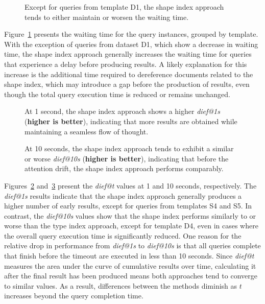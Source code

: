 \begin{figure}
    \centering
    
    \caption{Except for queries from template D1, the shape index approach tends to either maintain or worsen the waiting time.}
    \label{fig:waiting_time}
\end{figure}

Figure~\ref{fig:waiting_time} presents the waiting time for the query instances, grouped by template. 
With the exception of queries from dataset D1, which show a decrease in waiting time, the shape index approach generally increases the waiting time for queries that experience a delay before producing results. 
A likely explanation for this increase is the additional time required to dereference documents related to the shape index, which may introduce a gap before the production of results, even though the total query execution time is reduced or remains unchanged.


\begin{figure}
    \centering
    
    \caption{At 1 second, the shape index approach shows a higher \textit{dief@1s} (\textbf{higher is better}), indicating that more results are obtained while maintaining a seamless flow of thought.}
    \label{fig:dief_1}
\end{figure}

\begin{figure}
    \centering
    
    \caption{At 10 seconds, the shape index approach tends to exhibit a similar or worse \textit{dief@10s} (\textbf{higher is better}), indicating that before the attention drift, the shape index approach performs comparably.}
    \label{fig:dief_10}
\end{figure}

Figures~\ref{fig:dief_1} and~\ref{fig:dief_10} present the \textit{dief@t} values at 1 and 10 seconds, respectively.
The \textit{dief@1s} results indicate that the shape index approach generally produces a higher number of early results, except for queries from templates S4 and S5.
In contrast, the \textit{dief@10s} values show that the shape index performs similarly to or worse than the type index approach, except for template D4, even in cases where the overall query execution time is significantly reduced.
One reason for the relative drop in performance from \textit{dief@1s} to \textit{dief@10s} is that all queries complete that finish before the timeout are executed  in less than 10 seconds.
Since \textit{dief@t} measures the area under the curve of cumulative results over time, calculating it after the final result has been produced means both approaches tend to converge to similar values.
As a result, differences between the methods diminish as $t$ increases beyond the query completion time.


